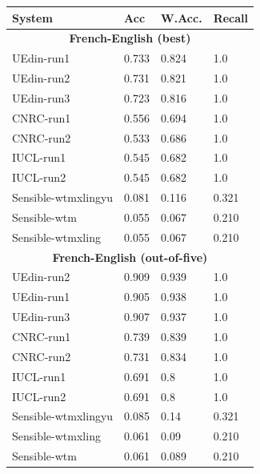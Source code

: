 \begin{table}[tb]
{\small
\begin{tabular}{|l|lll|}
\hline
System                & Acc & W.Acc. & Recall    \\ \hline
\multicolumn{4}{|c|}{\textbf{French-English (best)}} \\
\hline
UEdin-run1          & 0.733    & 0.824         & 1.0                 \\
UEdin-run2          & 0.731    & 0.821         & 1.0                 \\
UEdin-run3          & 0.723    & 0.816         & 1.0                 \\
CNRC-run1           & 0.556    & 0.694         & 1.0                 \\
CNRC-run2           & 0.533    & 0.686         & 1.0                 \\
IUCL-run1           & 0.545    & 0.682         & 1.0                 \\
IUCL-run2           & 0.545    & 0.682         & 1.0                 \\
Sensible-wtmxlingyu & 0.081    & 0.116         & 0.321  \\
Sensible-wtm        & 0.055    & 0.067         & 0.210  \\
Sensible-wtmxling   & 0.055    & 0.067         & 0.210  \\
\hline
\multicolumn{4}{|c|}{\textbf{French-English (out-of-five)}} \\
\hline
UEdin-run2          & 0.909    & 0.939         & 1.0                 \\
UEdin-run1          & 0.905    & 0.938         & 1.0                 \\
UEdin-run3          & 0.907    & 0.937         & 1.0                 \\
CNRC-run1           & 0.739    & 0.839         & 1.0                 \\
CNRC-run2           & 0.731    & 0.834         & 1.0                 \\
IUCL-run1           & 0.691    & 0.8           & 1.0                 \\
IUCL-run2           & 0.691    & 0.8           & 1.0                 \\
Sensible-wtmxlingyu & 0.085    & 0.14          & 0.321  \\
Sensible-wtmxling   & 0.061    & 0.09          & 0.210  \\
Sensible-wtm        & 0.061    & 0.089         & 0.210  \\

\end{tabular}}
\end{table}
